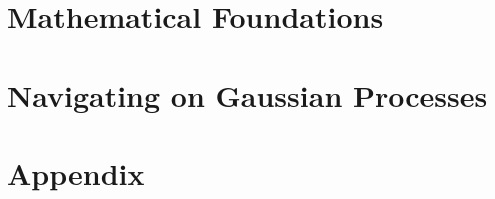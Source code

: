 \documentclass[
	12pt,
	UKenglish,
	a4paper
	]{book}
\numberwithin{figure}{chapter}
\numberwithin{table}{chapter}
\numberwithin{algorithm}{chapter}
\begin{document}




\part{Mathematical Foundations}









\part{Navigating on Gaussian Processes}

\part{Appendix}

\appendix


\end{document}

